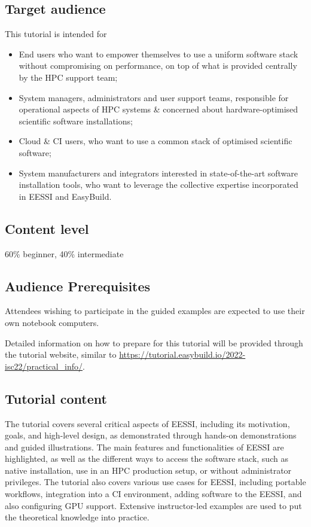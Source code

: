 \subsection*{Target audience}
This tutorial is intended for
\begin{itemize}
    \item End users who want to empower themselves to use a uniform software stack without compromising on
          performance, on top of what is provided centrally by the HPC support team;
    \item System managers, administrators and user support teams, responsible for operational aspects of HPC systems \&
          concerned about hardware-optimised scientific software installations;
    \item Cloud \& CI users, who want to use a common stack of optimised scientific software;
    \item System manufacturers and integrators interested in state-of-the-art software installation tools, who want to
          leverage the collective expertise incorporated in EESSI and EasyBuild.
\end{itemize}

\subsection*{Content level}
60\% beginner, 40\% intermediate

\subsection*{Audience Prerequisites}
Attendees wishing to participate in the guided examples are expected to use their
own notebook computers.

Detailed information on how to prepare for this tutorial will be provided
through the tutorial website, similar to
\url{https://tutorial.easybuild.io/2022-isc22/practical_info/}.

\subsection*{Tutorial content}
The tutorial covers several critical aspects of EESSI, including its motivation, goals, and high-level design, as
demonstrated through hands-on demonstrations and guided illustrations. The main features and functionalities of EESSI
are highlighted, as well as the different ways to access the software stack, such as native installation, use in an HPC
production setup, or without administrator privileges. The tutorial also covers various use cases for EESSI, including
portable workflows, integration into a CI environment, adding software to the EESSI, and also configuring GPU support.
Extensive instructor-led examples are used to put the theoretical knowledge into practice.

